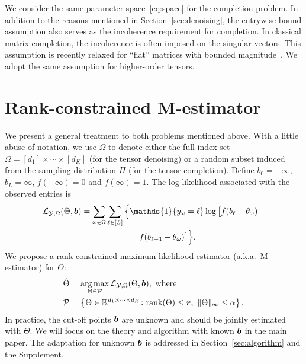 \documentclass{article}
\theoremstyle{plain}
\theoremstyle{definition}
\begin{document}
We consider the same parameter space~\eqref{eq:space} for the completion problem. In addition to the reasons mentioned in Section~\ref{sec:denoising}, the entrywise bound assumption also serves as the incoherence requirement for completion. In classical matrix completion, the incoherence is often imposed on the singular vectors. This assumption is recently relaxed for ``flat'' matrices with bounded magnitude~\cite{negahban2011estimation,cai2013max,bhaskar20151}. We adopt the same assumption for higher-order tensors.

\section{Rank-constrained M-estimator}\label{sec:theory}
\vspace{-.1cm}
We present a general treatment to both problems mentioned above. With a little abuse of notation, we use $\Omega$ to denote either the full index set $\Omega=[d_1]\times \cdots \times [d_K]$ (for the tensor denoising) or a random subset induced from the sampling distribution $\Pi$ (for the tensor completion). Define $b_0=-\infty$, $b_L=\infty$, $f(-\infty)=0$ and $f(\infty)=1$. The log-likelihood associated with the observed entries is
\begin{align}\label{eq:objective}
\logl(\Theta, \mb)&=\sum_{\omega\in\Omega}\sum_{\ell\in[L]} \Big\{\mathds{1}\{y_\omega=\ell\} \log \big[f(b_\ell-\theta_\omega)- \notag \\
&\quad \quad \quad \quad \quad \quad \quad  f(b_{\ell-1}-\theta_\omega)\big]\Big\}.
\end{align}
We propose a rank-constrained maximum likelihood estimator (a.k.a.\ M-estimator) for $\Theta$:
\begin{align}\label{eq:estimator}
\hat \Theta&=\argmax_{\Theta\in \tP}\logl(\Theta, \mb),\ \text{where}\notag \\
\tP&=\left\{\Theta\in\mathbb{R}^{d_1\times \cdots \times d_K} \colon \text{rank}(\Theta)\leq \mr,\ \mnormSize{}{\Theta}\leq \alpha\right\}.
 \end{align}
In practice, the cut-off points $\bm{b}$ are unknown and should be jointly estimated with $\Theta$. We will focus on the theory and algorithm with known $\bm{b}$ in the main paper. The adaptation for unknown $\bm{b}$ is addressed in Section~\ref{sec:algorithm} and the Supplement.
\end{document}
